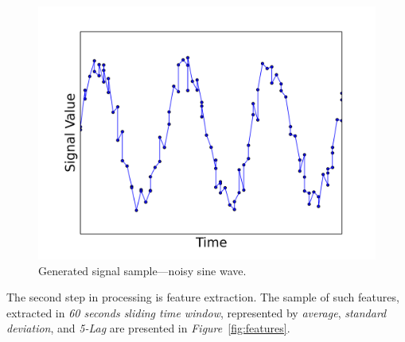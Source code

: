 \documentclass[11pt, letterpaper]{article}            %
\begin{document}
\begin{figure}[htbp]
  \centering
  \includegraphics[width=.7\textwidth]{./gfx/feature5.png}
  \caption{Generated signal sample---noisy sine wave.\label{fig:signal}}
\end{figure}

The second step in processing is feature extraction. The sample of such features, extracted in \emph{60 seconds sliding time window}, represented by \emph{average}, \emph{standard deviation}, and \emph{5-Lag} are presented in \emph{Figure}~\ref{fig:features}.\\
\end{document}
